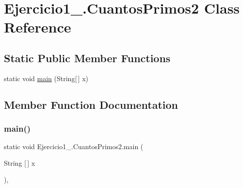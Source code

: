 \hypertarget{class_ejercicio1__2_1_1_cuantos_primos2}{}\section{Ejercicio1\+\_.\+Cuantos\+Primos2 Class Reference}
\label{class_ejercicio1__2_1_1_cuantos_primos2}
\subsection*{Static Public Member Functions}
\begin{DoxyCompactItemize}
\item 
static void \mbox{\hyperlink{class_ejercicio1__2_1_1_cuantos_primos2_a100661a63e977cec522323e3e4513c37}{main}} (String\mbox{[}$\,$\mbox{]} x)
\end{DoxyCompactItemize}


\subsection{Member Function Documentation}
\mbox{\label{class_ejercicio1__2_1_1_cuantos_primos2_a100661a63e977cec522323e3e4513c37}} 
\subsubsection{\texorpdfstring{main()}{main()}}
{\footnotesize\ttfamily static void Ejercicio1\+\_.\+Cuantos\+Primos2.\+main (\begin{DoxyParamCaption}\item[{String \mbox{[}$\,$\mbox{]}}]{x }\end{DoxyParamCaption})\hspace{0.3cm}{\ttfamily [inline]}, {\ttfamily [static]}}


